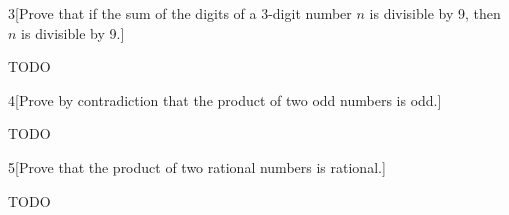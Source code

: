 \documentclass{homework}
\begin{document}

\begin{problem}{3}[Prove that if the sum of the digits of a 3-digit number $n$ is divisible by 9, then $n$ is divisible by 9.]

TODO

\end{problem}


\begin{problem}{4}[Prove by contradiction that the product of two odd numbers is odd.]

TODO

\end{problem}


\begin{problem}{5}[Prove that the product of two rational numbers is rational.]

TODO

\end{problem}
\end{document}
